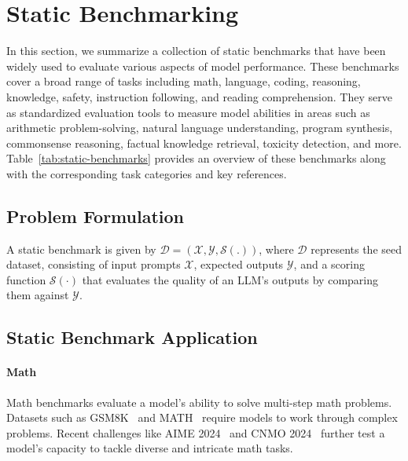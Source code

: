 


\section{Static Benchmarking}
\label{sec:static}


In this section, we summarize a collection of static benchmarks that have been widely used to evaluate various aspects of model performance. These benchmarks cover a broad range of tasks including math, language, coding, reasoning, knowledge, safety, instruction following, and reading comprehension. They serve as standardized evaluation tools to measure model abilities in areas such as arithmetic problem-solving, natural language understanding, program synthesis, commonsense reasoning, factual knowledge retrieval, toxicity detection, and more. Table~\ref{tab:static-benchmarks} provides an overview of these benchmarks along with the corresponding task categories and key references.

\subsection{Problem Formulation}
A static benchmark is given by
$ \mathcal{D} = (\mathcal{X}, \mathcal{Y}, \mathcal{S}(.)) $, 
where \( \mathcal{D} \) represents the seed dataset, consisting of input prompts \( \mathcal{X} \), expected outputs \( \mathcal{Y} \), and a scoring function \( \mathcal{S}(\cdot) \) that evaluates the quality of an LLM's outputs by comparing them against \( \mathcal{Y} \). 

\subsection{Static Benchmark Application}

\paragraph{Math}
Math benchmarks evaluate a model’s ability to solve multi-step math problems. 
Datasets such as GSM8K~\citep{cobbe2021training} and MATH~\citep{hendrycks2021measuring} require models to work through complex problems. Recent challenges like AIME 2024~\citep{maa2024aime} and CNMO 2024~\citep{cnmo2024} further test a model’s capacity to tackle diverse and intricate math tasks.

